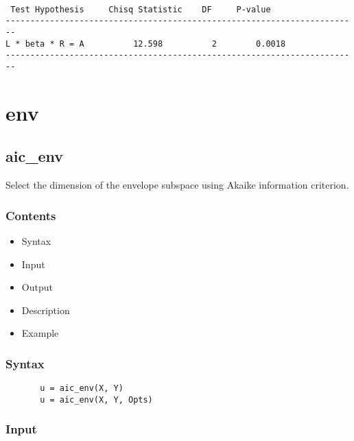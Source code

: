 \documentclass[a4paper,11pt,openany]{memoir}
\begin{document}
        \color{lightgray}\ttfamily \begin{verbatim}

 Test Hypothesis     Chisq Statistic    DF     P-value
------------------------------------------------------------------------
L * beta * R = A          12.598          2        0.0018
------------------------------------------------------------------------
\end{verbatim} \rmfamily
\color{black}
    


\newpage


\chapter{env}
    
\rmfamily
\color{black}\section{aic\_env}

\begin{par}
Select the dimension of the envelope subspace using Akaike information criterion.
\end{par} \vspace{1em}

\subsection*{Contents}

\begin{itemize}
\setlength{\itemsep}{-1ex}
   \item Syntax
   \item Input
   \item Output
   \item Description
   \item Example
\end{itemize}


\subsection*{Syntax}


\begin{verbatim}       u = aic_env(X, Y)
       u = aic_env(X, Y, Opts)\end{verbatim}
    

\subsection*{Input}
\end{document}
